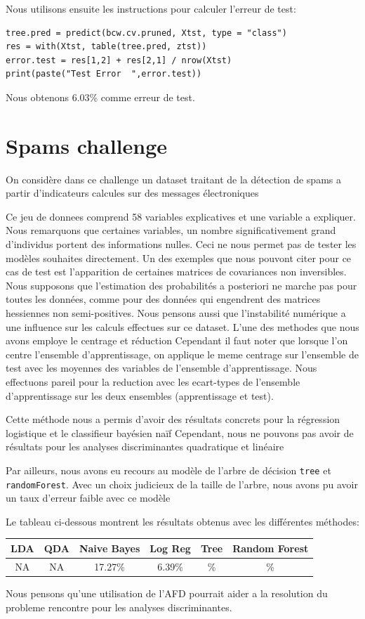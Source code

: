 \documentclass[10pt]{article}
\begin{document}
Nous utilisons ensuite les instructions pour calculer l'erreur de test:
\begin{lstlisting}
tree.pred = predict(bcw.cv.pruned, Xtst, type = "class")
res = with(Xtst, table(tree.pred, ztst))
error.test = res[1,2] + res[2,1] / nrow(Xtst)
print(paste("Test Error  ",error.test))
\end{lstlisting}

Nous obtenons 6.03\% comme erreur de test.

\section{Spams challenge}

On considère dans ce challenge un dataset traitant de la détection de spams a partir d'indicateurs calcules sur des messages électroniques 

Ce jeu de donnees comprend 58 variables explicatives et une variable a expliquer. Nous remarquons que certaines variables, un nombre significativement grand d'individus portent des informations nulles. Ceci ne nous permet pas de tester les modèles souhaites directement. Un des exemples que nous pouvont citer pour ce cas de test est l'apparition de certaines matrices de covariances non inversibles. Nous supposons que l'estimation des probabilités a posteriori ne marche pas pour toutes les données, comme pour des données qui engendrent des matrices hessiennes non semi-positives. Nous pensons aussi que l'instabilité numérique a une influence sur les calculs effectues sur ce dataset.
L'une des methodes que nous avons employe le centrage et réduction Cependant il faut noter que lorsque l'on centre l'ensemble d'apprentissage, on applique le meme centrage sur l'ensemble de test avec les moyennes des variables de l'ensemble d'apprentissage. Nous effectuons pareil pour la reduction avec les ecart-types de l'ensemble d'apprentissage sur les deux ensembles (apprentissage et test). 

Cette méthode nous a permis d'avoir des résultats concrets pour la régression logistique et le classifieur bayésien naïf Cependant, nous ne pouvons pas avoir de résultats pour les analyses discriminantes quadratique et linéaire 

Par ailleurs, nous avons eu recours au modèle de l'arbre de décision \texttt{tree} et \texttt{randomForest}. Avec un choix judicieux de la taille de l'arbre, nous avons pu avoir un taux d'erreur faible avec ce modèle 

Le tableau ci-dessous montrent les résultats obtenus avec les différentes méthodes:
\begin{center}
	\begin{tabular}{|c | c | c| c| c| c|}
		\hline
		LDA & QDA & Naive Bayes & Log Reg & Tree & Random Forest\\
		\hline	
		NA & NA & 17.27\% & 6.39\% &  \%& \%
	\end{tabular}
\end{center}

Nous pensons qu'une utilisation de l'AFD pourrait aider a la resolution du probleme rencontre pour les analyses discriminantes. 
\end{document}
